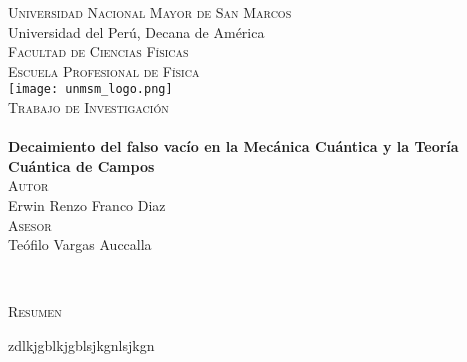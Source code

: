 \documentclass[12pt, a4paper, oneside]{book}
\begin{document}
	
\frontmatter
	
\begin{titlepage}
\begin{center}

\thispagestyle{empty}

\textsc{\LARGE{Universidad Nacional Mayor de San Marcos}} \\
\large{Universidad del Perú, Decana de América} \\ [0.5cm] 
\textsc{\LARGE Facultad de Ciencias Físicas} \\  
\textsc{\Large Escuela Profesional de Física} \\ [1cm]

\texttt{[image: unmsm\_logo.png]} \\ [1cm]

\textsc{\LARGE Trabajo de Investigación} \\ [0.25cm]
\large {} \\ [0.5cm]

\LARGE{\bfseries{Decaimiento del falso vacío en la Mecánica Cuántica y la Teoría Cuántica de Campos}} \\ [0.5cm] 

\textsc{\LARGE Autor} \\ [0.25cm] 
\large{Erwin Renzo Franco Diaz} \\ [0.5cm]

\textsc{\LARGE Asesor} \\ [0.25cm] 
\large{Teófilo Vargas Auccalla} \\ 

\vfill

\large {} \\ [0.25cm]
\large {}

\end{center}
\end{titlepage}



\begin{center}
	\thispagestyle{plain}
	\setlength{\parskip}{0pt}
	{\huge{\textsc{Resumen}} \par}
\end{center}

zdlkjgblkjgblsjkgnlsjkgn

\newpage

\end{document}
